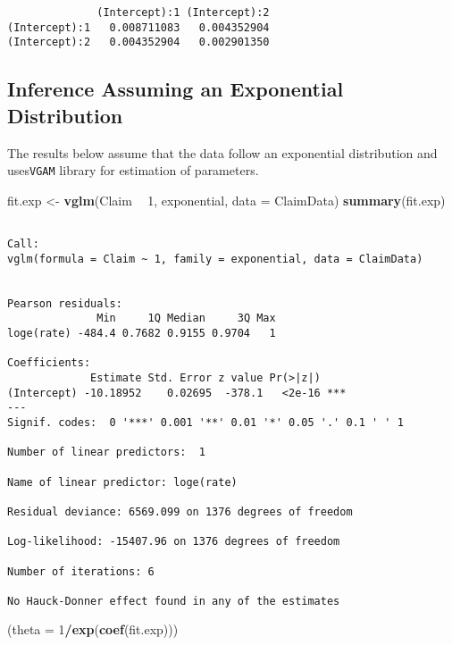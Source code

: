 \documentclass[]{book}
\newenvironment{Shaded}{\begin{snugshade}}{\end{snugshade}}
\newcommand{\KeywordTok}[1]{\textcolor[rgb]{0.13,0.29,0.53}{\textbf{#1}}}
\newcommand{\DataTypeTok}[1]{\textcolor[rgb]{0.13,0.29,0.53}{#1}}
\newcommand{\DecValTok}[1]{\textcolor[rgb]{0.00,0.00,0.81}{#1}}
\newcommand{\StringTok}[1]{\textcolor[rgb]{0.31,0.60,0.02}{#1}}
\newcommand{\OperatorTok}[1]{\textcolor[rgb]{0.81,0.36,0.00}{\textbf{#1}}}
\newcommand{\NormalTok}[1]{#1}
\theoremstyle{definition}
\theoremstyle{definition}
\theoremstyle{definition}
\theoremstyle{remark}
\begin{document}
\begin{verbatim}
              (Intercept):1 (Intercept):2
(Intercept):1   0.008711083   0.004352904
(Intercept):2   0.004352904   0.002901350
\end{verbatim}

\subsection{Inference Assuming an Exponential
Distribution}\label{inference-assuming-an-exponential-distribution}

The results below assume that the data follow an exponential
distribution and uses\texttt{VGAM} library for estimation of parameters.

\begin{Shaded}
\begin{Highlighting}[]
\NormalTok{fit.exp <-}\StringTok{ }\KeywordTok{vglm}\NormalTok{(Claim }\OperatorTok{~}\StringTok{ }\DecValTok{1}\NormalTok{, exponential, }\DataTypeTok{data =}\NormalTok{ ClaimData)}
\KeywordTok{summary}\NormalTok{(fit.exp)}
\end{Highlighting}
\end{Shaded}

\begin{verbatim}

Call:
vglm(formula = Claim ~ 1, family = exponential, data = ClaimData)


Pearson residuals:
              Min     1Q Median     3Q Max
loge(rate) -484.4 0.7682 0.9155 0.9704   1

Coefficients: 
             Estimate Std. Error z value Pr(>|z|)    
(Intercept) -10.18952    0.02695  -378.1   <2e-16 ***
---
Signif. codes:  0 '***' 0.001 '**' 0.01 '*' 0.05 '.' 0.1 ' ' 1

Number of linear predictors:  1 

Name of linear predictor: loge(rate) 

Residual deviance: 6569.099 on 1376 degrees of freedom

Log-likelihood: -15407.96 on 1376 degrees of freedom

Number of iterations: 6 

No Hauck-Donner effect found in any of the estimates
\end{verbatim}

\begin{Shaded}
\begin{Highlighting}[]
\NormalTok{(}\DataTypeTok{theta =} \DecValTok{1}\OperatorTok{/}\KeywordTok{exp}\NormalTok{(}\KeywordTok{coef}\NormalTok{(fit.exp)))}
\end{Highlighting}
\end{Shaded}
\end{document}
